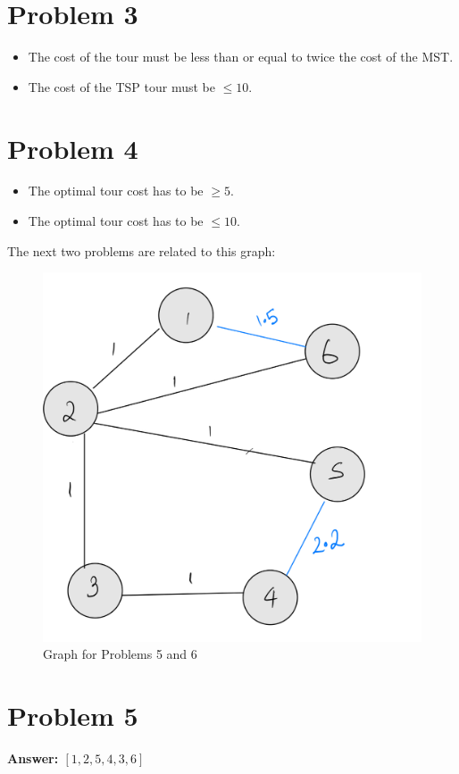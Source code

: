 \documentclass[11pt]{article}
\begin{document}
\section*{Problem 3}
\label{sec:org344f08b}
\begin{itemize}
\item The cost of the tour must be less than or equal to twice the cost of the MST.
\item The cost of the TSP tour must be \(\leq 10\).
\end{itemize}
\section*{Problem 4}
\label{sec:org1e973fc}
\begin{itemize}
\item The optimal tour cost has to be \(\geq 5\).
\item The optimal tour cost has to be \(\leq 10\).
\end{itemize}

\newpage

The next two problems are related to this graph:
\begin{figure}[H]
  \centering
  \includegraphics[scale=0.15]{tsp_mst_with_matching.jpeg}
  \caption{Graph for Problems 5 and 6}
\end{figure}
\section*{Problem 5}
\label{sec:orgdafc2e8}
\textbf{Answer: \([1,2,5,4,3,6]\)}
\end{document}
